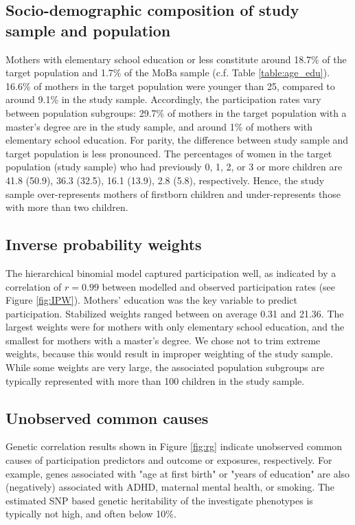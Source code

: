 \documentclass[12pt]{article}
\begin{document}
\subsection*{Socio-demographic composition of study sample and population}
 Mothers with elementary school education or less constitute around 18.7\% of the target population and 1.7\% of the MoBa sample (c.f. Table \ref{table:age_edu}). 16.6\% of mothers in the target population were younger than 25, compared to around 9.1\% in the study sample. Accordingly, the participation rates vary between population subgroups: 29.7\% of mothers in the target population with a master's degree are in the study sample, and around 1\% of mothers with elementary school education. For parity, the difference between study sample and target population is less pronounced. The percentages of women in the target population (study sample) who had previously 0, 1, 2, or 3 or more children are 41.8 (50.9), 36.3 (32.5), 16.1 (13.9), 2.8 (5.8), respectively. Hence, the study sample over-represents mothers of firstborn children and under-represents those with more than two children.

\subsection*{Inverse probability weights}
The hierarchical binomial model captured participation well, as indicated by a correlation of $r=0.99$ between modelled and observed participation rates (see Figure \ref{fig:IPW}). Mothers' education was the key variable to predict participation. Stabilized weights ranged between on average 0.31 and 21.36. The largest weights were for mothers with only elementary school education, and the smallest for mothers with a master's degree. We chose not to trim extreme weights, because this would result in improper weighting of the study sample. While some weights are very large, the associated population subgroups are typically represented with more than  100 children in the study sample.

\subsection*{Unobserved common causes}
Genetic correlation results shown in Figure \ref{fig:rg} indicate unobserved common causes of participation predictors and outcome or exposures, respectively. For example, genes associated with "age at first birth" or "years of education" are also (negatively) associated with ADHD, maternal mental health, or smoking. The estimated SNP based genetic heritability of the investigate phenotypes is typically not high, and often below 10\%.
\end{document}
